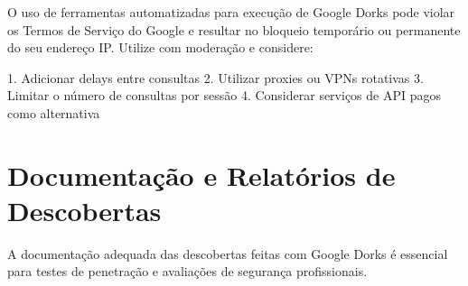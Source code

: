 \documentclass[12pt,a4paper]{book}
\begin{document}
\begin{alertbox}
O uso de ferramentas automatizadas para execução de Google Dorks pode violar os Termos de Serviço do Google e resultar no bloqueio temporário ou permanente do seu endereço IP. Utilize com moderação e considere:

1. Adicionar delays entre consultas
2. Utilizar proxies ou VPNs rotativas
3. Limitar o número de consultas por sessão
4. Considerar serviços de API pagos como alternativa
\end{alertbox}

\section{Documentação e Relatórios de Descobertas}

A documentação adequada das descobertas feitas com Google Dorks é essencial para testes de penetração e avaliações de segurança profissionais.
\end{document}
